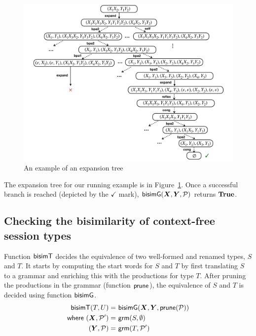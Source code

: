 
\begin{figure}[t]
  \centering
  \includegraphics[width=12cm]{img/expansion_tree_example}  
  \caption{An example of an expansion tree}
  \label{fig:expansion-tree}
\end{figure}

\begin{example}
  The expansion tree for our running example is in
  Figure~\ref{fig:expansion-tree}. Once a successful branch is reached
  (depicted by the $\checkmark$ mark),
  $\Bisim(\vec X, \vec Y, \productions)$ returns $\mathbf{True}$.
\end{example}

\subsection{Checking the bisimilarity of context-free session types}

Function $\mathsf{bisimT}$ decides the equivalence of two well-formed and
renamed types, $S$ and $T$.  It starts by computing the start words
for $S$ and $T$ by first translating $S$ to a grammar and enriching
this with the productions for type $T$. After pruning the productions
in the grammar (function $\mathsf{prune}$), the equivalence of $S$ and
$T$ is decided using function $\mathsf{bisimG}$.
%
\begin{align*}
  \BisimT(T, U) =&\ \Bisim(\vec X, \vec Y, \Prune (\productions))
  \\
  \mathsf{where}\ (\vec X, \productions') =&\ \grm (S, \emptyset)
  \\
  (\vec Y, \productions) =&\ \grm (T, \productions')
\end{align*}

